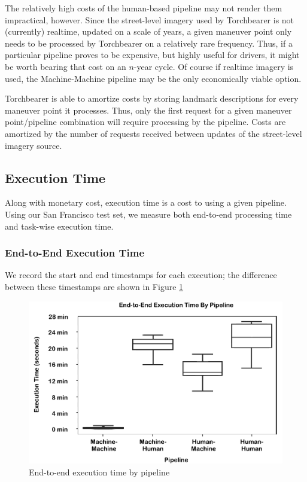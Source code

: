 The relatively high costs of the human-based pipeline may not render them impractical, however. Since the street-level imagery used by Torchbearer is not (currently) realtime, updated on a scale of years, a given maneuver point only needs to be processed by Torchbearer on a relatively rare frequency. Thus, if a particular pipeline proves to be expensive, but highly useful for drivers, it might be worth bearing that cost on an $n$-year cycle. Of course if realtime imagery is used, the Machine-Machine pipeline may be the only economically viable option. 

Torchbearer is able to amortize costs by storing landmark descriptions for every maneuver point it processes. Thus, only the first request for a given maneuver point/pipeline combination will require processing by the pipeline. Costs are amortized by the number of requests received between updates of the street-level imagery source.

\subsection{Execution Time}
Along with monetary cost, execution time is a cost to using a given pipeline. Using our San Francisco test set, we measure both end-to-end processing time and task-wise execution time.

\subsubsection{End-to-End Execution Time}
We record the start and end timestamps for each execution; the difference between these timestamps are shown in Figure \ref{fig:plot:executiontime}

\begin{figure}[htbp]
  \centering
  \includegraphics[width=\textwidth]{images/plot_executiontime.pdf}
  \caption{End-to-end execution time by pipeline}
  \label{fig:plot:executiontime}
\end{figure}

